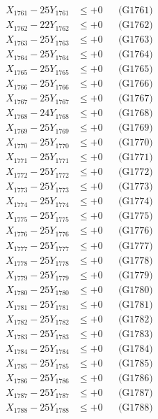 \documentclass[a4paper,10pt]{article}
\begin{document}
{\begin{align}
X_{1761} - 25Y_{1761} &\leq +0 && \text{(G1761)} \\
X_{1762} - 22Y_{1762} &\leq +0 && \text{(G1762)} \\
X_{1763} - 25Y_{1763} &\leq +0 && \text{(G1763)} \\
X_{1764} - 25Y_{1764} &\leq +0 && \text{(G1764)} \\
X_{1765} - 25Y_{1765} &\leq +0 && \text{(G1765)} \\
X_{1766} - 25Y_{1766} &\leq +0 && \text{(G1766)} \\
X_{1767} - 25Y_{1767} &\leq +0 && \text{(G1767)} \\
X_{1768} - 24Y_{1768} &\leq +0 && \text{(G1768)} \\
X_{1769} - 25Y_{1769} &\leq +0 && \text{(G1769)} \\
X_{1770} - 25Y_{1770} &\leq +0 && \text{(G1770)} \\
\allowbreak
X_{1771} - 25Y_{1771} &\leq +0 && \text{(G1771)} \\
X_{1772} - 25Y_{1772} &\leq +0 && \text{(G1772)} \\
X_{1773} - 25Y_{1773} &\leq +0 && \text{(G1773)} \\
X_{1774} - 25Y_{1774} &\leq +0 && \text{(G1774)} \\
X_{1775} - 25Y_{1775} &\leq +0 && \text{(G1775)} \\
X_{1776} - 25Y_{1776} &\leq +0 && \text{(G1776)} \\
X_{1777} - 25Y_{1777} &\leq +0 && \text{(G1777)} \\
X_{1778} - 25Y_{1778} &\leq +0 && \text{(G1778)} \\
X_{1779} - 25Y_{1779} &\leq +0 && \text{(G1779)} \\
X_{1780} - 25Y_{1780} &\leq +0 && \text{(G1780)} \\
\allowbreak
X_{1781} - 25Y_{1781} &\leq +0 && \text{(G1781)} \\
X_{1782} - 25Y_{1782} &\leq +0 && \text{(G1782)} \\
X_{1783} - 25Y_{1783} &\leq +0 && \text{(G1783)} \\
X_{1784} - 25Y_{1784} &\leq +0 && \text{(G1784)} \\
X_{1785} - 25Y_{1785} &\leq +0 && \text{(G1785)} \\
X_{1786} - 25Y_{1786} &\leq +0 && \text{(G1786)} \\
X_{1787} - 25Y_{1787} &\leq +0 && \text{(G1787)} \\
X_{1788} - 25Y_{1788} &\leq +0 && \text{(G1788)} \\

\end{align}}
\end{document}
